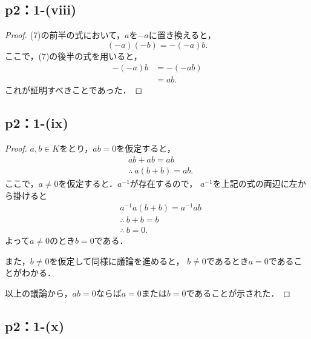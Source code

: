 \documentclass[a4paper,10pt,fleqn]{ltjsarticle}
\begin{document}
\subsection*{p2：1-(viii)}

\begin{leftbar}
    \begin{proof}
        (7)の前半の式において，$a$を$-a$に置き換えると，
        \[
            (-a)(-b) = -(-a)b.
        \]
        ここで，(7)の後半の式を用いると，
        \begin{align*}
            -(-a)b & = -(-ab) \\
                   & = ab.
        \end{align*}
        これが証明すべきことであった．
    \end{proof}
\end{leftbar}


\subsection*{p2：1-(ix)}

\begin{leftbar}
    \begin{proof}
        $ a, b \in K$をとり，$ab =0$を仮定すると，
        \begin{align*}
             & ab + ab = ab            \\
             & \therefore ~ a(b+b)=ab.
        \end{align*}
        ここで，$a \ne 0$を仮定すると．$a^{-1}$が存在するので，
        $a^{-1}$を上記の式の両辺に左から掛けると
        \begin{align*}
             & a^{-1}a(b+b)=a^{-1}ab \\
             & \therefore ~ b+b=b    \\
             & \therefore ~ b=0.
        \end{align*}
        よって$a \ne 0$のとき$b=0$である．

        また，$b \ne 0$を仮定して同様に議論を進めると，
        $b \ne 0$であるとき$ a=0$であることがわかる．

        以上の議論から，$ab=0$ならば$a=0$または$b=0$であることが示された．
    \end{proof}
\end{leftbar}

\subsection*{p2：1-(x)}
\end{document}
